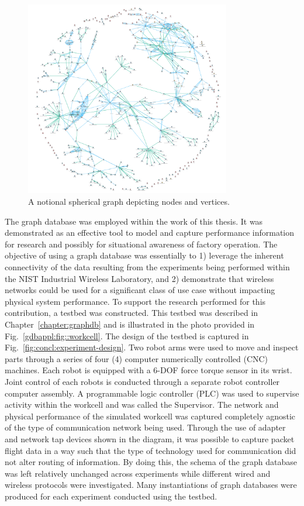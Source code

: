 \begin{figure}[!ht]
	\centering
	\includegraphics[width=0.8\textwidth]{chapter-conclusions/images/spherical-graph.png}
	\caption{A notional spherical graph depicting nodes and vertices.}
	\label{fig:concl:graphdb-sperical}
\end{figure}

The graph database was employed within the work of this thesis.  It was demonstrated as an effective tool to model and capture performance information for research and possibly for situational awareness of factory operation.  The objective of using a graph database was essentially to 1) leverage the inherent connectivity of the data resulting from the experiments being performed within the NIST Industrial Wireless Laboratory, and 2) demonstrate that wireless networks could be used for a significant class of use case without impacting physical system performance. To support the research performed for this contribution, a testbed was constructed. This testbed was described in Chapter~\ref{chapter:graphdb} and is illustrated in the photo provided in Fig.~\ref{gdbappl:fig::workcell}.  The design of the testbed is captured in Fig.~\ref{fig:concl:experiment-design}.  Two robot arms were used to move and inspect parts through a series of four (4) computer numerically controlled (CNC) machines.  Each robot is equipped with a 6-DOF force torque sensor in its wrist.  Joint control of each robots is conducted through a separate robot controller computer assembly.  A programmable logic controller (PLC) was used to supervise activity within the workcell and was called the Supervisor.  The network and physical performance of the simulated workcell was captured completely agnostic of the type of communication network being used.  Through the use of adapter and network tap devices shown in the diagram, it was possible to capture packet flight data in a way such that the type of technology used for communication did not alter routing of information.  By doing this, the schema of the graph database was left relatively unchanged across experiments while different wired and wireless protocols were investigated. Many instantiations of graph databases were produced for each experiment conducted using the testbed.  

